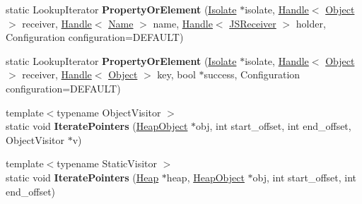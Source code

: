 \begin{DoxyCompactItemize}
\item 
static Lookup\+Iterator {\bfseries Property\+Or\+Element} (\hyperlink{classv8_1_1internal_1_1_isolate}{Isolate} $\ast$isolate, \hyperlink{classv8_1_1internal_1_1_handle}{Handle}$<$ \hyperlink{classv8_1_1internal_1_1_object}{Object} $>$ receiver, \hyperlink{classv8_1_1internal_1_1_handle}{Handle}$<$ \hyperlink{classv8_1_1internal_1_1_name}{Name} $>$ name, \hyperlink{classv8_1_1internal_1_1_handle}{Handle}$<$ \hyperlink{classv8_1_1internal_1_1_j_s_receiver}{J\+S\+Receiver} $>$ holder, Configuration configuration=D\+E\+F\+A\+U\+LT)\hypertarget{classv8_1_1internal_1_1_b_a_s_e___e_m_b_e_d_d_e_d_aee5128497cc30059b0753d4458f4373d}{}\label{classv8_1_1internal_1_1_b_a_s_e___e_m_b_e_d_d_e_d_aee5128497cc30059b0753d4458f4373d}

\item 
static Lookup\+Iterator {\bfseries Property\+Or\+Element} (\hyperlink{classv8_1_1internal_1_1_isolate}{Isolate} $\ast$isolate, \hyperlink{classv8_1_1internal_1_1_handle}{Handle}$<$ \hyperlink{classv8_1_1internal_1_1_object}{Object} $>$ receiver, \hyperlink{classv8_1_1internal_1_1_handle}{Handle}$<$ \hyperlink{classv8_1_1internal_1_1_object}{Object} $>$ key, bool $\ast$success, Configuration configuration=D\+E\+F\+A\+U\+LT)\hypertarget{classv8_1_1internal_1_1_b_a_s_e___e_m_b_e_d_d_e_d_abe3a1a13d8522d09a849da6a3e05a499}{}\label{classv8_1_1internal_1_1_b_a_s_e___e_m_b_e_d_d_e_d_abe3a1a13d8522d09a849da6a3e05a499}

\item 
{\footnotesize template$<$typename Object\+Visitor $>$ }\\static void {\bfseries Iterate\+Pointers} (\hyperlink{classv8_1_1internal_1_1_heap_object}{Heap\+Object} $\ast$obj, int start\+\_\+offset, int end\+\_\+offset, Object\+Visitor $\ast$v)\hypertarget{classv8_1_1internal_1_1_b_a_s_e___e_m_b_e_d_d_e_d_a1b63686c178e93191b03cdf7eac1eaf5}{}\label{classv8_1_1internal_1_1_b_a_s_e___e_m_b_e_d_d_e_d_a1b63686c178e93191b03cdf7eac1eaf5}

\item 
{\footnotesize template$<$typename Static\+Visitor $>$ }\\static void {\bfseries Iterate\+Pointers} (\hyperlink{classv8_1_1internal_1_1_heap}{Heap} $\ast$heap, \hyperlink{classv8_1_1internal_1_1_heap_object}{Heap\+Object} $\ast$obj, int start\+\_\+offset, int end\+\_\+offset)\hypertarget{classv8_1_1internal_1_1_b_a_s_e___e_m_b_e_d_d_e_d_a42e1cbd8af5ff17e62c5386d8da91773}{}\label{classv8_1_1internal_1_1_b_a_s_e___e_m_b_e_d_d_e_d_a42e1cbd8af5ff17e62c5386d8da91773}


\end{DoxyCompactItemize}
